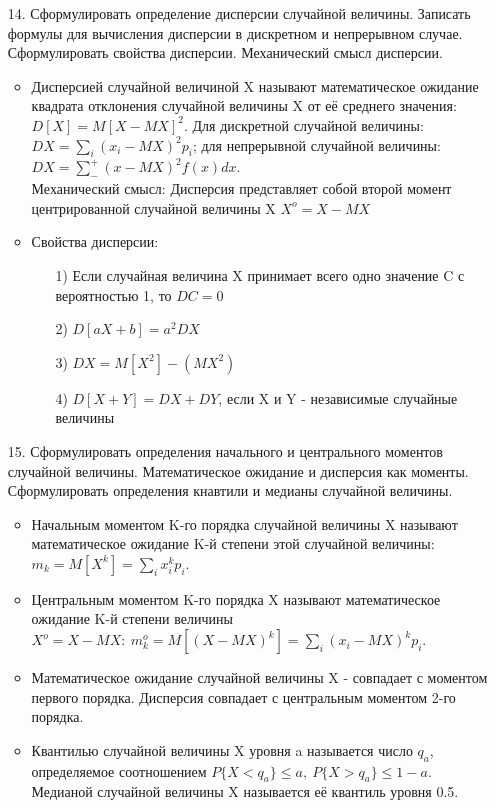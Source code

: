 \documentclass[a4paper]{article}
\begin{document}
\begin{enumerate}
\item[14.] Сформулировать определение дисперсии случайной величины. Записать формулы для вычисления дисперсии в дискретном и непрерывном случае. Сформулировать свойства дисперсии. Механический смысл дисперсии. \\
\begin{itemize}
\item Дисперсией случайной величиной X называют математическое ожидание квадрата отклонения случайной величины X от её среднего значения: $D[X] = M[X - MX]^2$. Для дискретной случайной величины: $DX = \sum\limits_{i} (x_i - MX)^2 p_i$; для непрерывной случайной величины: $\displaystyle  DX = \sum\limits_{-}^{+} (x - MX)^2 f(x)dx$. \\
Механический смысл: Дисперсия представляет собой второй момент центрированной случайной величины X $X^o = X - MX$ 
\item Свойства дисперсии: 
	\begin{enumerate}
	\item[1)] Если случайная величина X принимает всего одно значение C с вероятностью 1, то $DC = 0$
	\item[2)] $D[aX + b] = a^2 DX$
	\item[3)] $DX = M[X^2] - (MX^2)$
	\item[4)] $D[X+Y] = DX + DY$, если X и Y - независимые случайные величины
	\end{enumerate}
\end{itemize}


\item[15.] Сформулировать определения начального и центрального моментов случайной величины. Математическое ожидание и дисперсия как моменты. Сформулировать определения кнавтили и медианы случайной величины. \\
\begin{itemize}
\item Начальным моментом K-го порядка случайной величины X называют математическое ожидание K-й степени этой случайной величины: $m_k = M\left[X^k\right] = \sum\limits_{i} x^k_i p_i$.
\item Центральным моментом K-го порядка X называют математическое ожидание K-й степени величины $X^o = X - MX: \ m^o_k = M\left[ (X - MX)^k \right] = \sum\limits_{i} (x_i - MX)^k p_i$.
\item Математическое ожидание случайной величины X - совпадает с моментом первого порядка. Дисперсия совпадает с центральным моментом 2-го порядка.
\item Квантилью случайной величины X уровня a называется число $q_a$, определяемое соотношением $P\{X < q_a\} \leqslant a, \ P\{X > q_a\} \leqslant 1 - a$. Медианой случайной величины X называется её квантиль уровня 0.5.
\end{itemize}



\end{enumerate}
\end{document}
